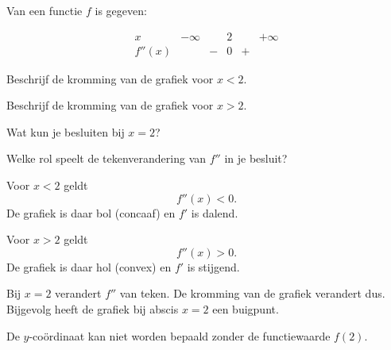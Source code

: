 \documentclass{ximera}
\begin{document}
\begin{oefening}{\oefB\ESS}

Van een functie $f$ is gegeven:

\[
\begin{array}{c|ccccc}
x       & -\infty &   & 2 &   & +\infty \\ \hline
f''(x)  &         & - & 0 & + &
\end{array}
\]

\begin{question}
Beschrijf de kromming van de grafiek voor $x<2$.
\end{question}

\begin{question}
Beschrijf de kromming van de grafiek voor $x>2$.
\end{question}

\begin{question}
Wat kun je besluiten bij $x=2$?
\end{question}

\begin{question}
Welke rol speelt de tekenverandering van $f''$ in je besluit?
\end{question}

\begin{oplossing}

Voor $x<2$ geldt
\[
f''(x)<0.
\]
De grafiek is daar bol (concaaf) en $f'$ is dalend.

Voor $x>2$ geldt
\[
f''(x)>0.
\]
De grafiek is daar hol (convex) en $f'$ is stijgend.

Bij $x=2$ verandert $f''$ van teken. De kromming van de grafiek verandert
dus. Bijgevolg heeft de grafiek bij abscis $x=2$ een buigpunt.

De $y$-coördinaat kan niet worden bepaald zonder de functiewaarde $f(2)$.

\end{oplossing}

\end{oefening}


\end{document}
